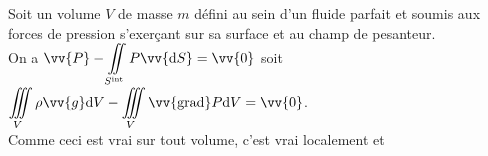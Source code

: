 ﻿\documentclass[a4paper]{article}
\begin{document}
\pagestyle{fancy}
\fancyhf{}
\setlength{\headheight}{15pt}

\begin{center}
	\large{}
\end{center}


Soit un volume \(V\) de masse \(m\) défini au sein d'un fluide parfait et soumis aux forces de pression s'exerçant sur sa surface et au champ de pesanteur.\\
On a \(\vv{P}-\ds\iint\limits_{S^{\mathrm{int}}}P\vv{\mathrm{d}S}=\vv{0}\) soit \(\ds\iiint\limits_V\rho\vv{g}\mathrm{d}V-\ds\iiint\limits_V\vv{\mathrm{grad}}P\mathrm{d}V=\vv{0}\).\\
Comme ceci est vrai sur tout volume, c'est vrai localement et \begin{center}\end{center}
\end{document}
